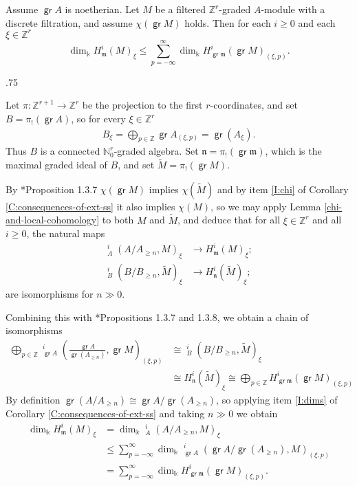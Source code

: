 \documentclass[11pt,fleqn]{article}
\makeatletter
\renewenvironment{proof}[1][\textit{Proof}]{\par
  \pushQED{\qed}%
  \normalfont \topsep.75\paraskip\relax
  \trivlist
  \item[\hskip\labelsep
        \itshape
    #1\@addpunct{.}]\ignorespaces
}{%
  \popQED\endtrivlist\@endpefalse
}
\newcommand\NN{\mathbb N}
\newcommand\ZZ{\mathbb Z}
\renewcommand\to{\longrightarrow}
\renewcommand\k{\Bbbk}
\newcommand\m{\mathfrak m}
\newcommand\n{\mathfrak n}
\DeclareMathOperator\GrExt{\underline{\mathsf{Ext}}}
\DeclareMathOperator\gr{\mathsf{gr}}
\makeatother
\begin{document}
\begin{Corollary*}
Assume $\gr A$ is noetherian. Let $M$ be a filtered $\ZZ^r$-graded $A$-module with a
discrete filtration, and assume $\chi(\gr M)$ holds. Then for each $i \geq 0$ and each 
$\xi \in \ZZ^r$ 
  \[
    \dim_\k H^i_\m(M)_\xi \leq \sum_{p=- \infty}^\infty \dim_\k H^i_{\gr \m}(\gr
    M)_{(\xi, p)}.
  \]
\end{Corollary*}
\begin{proof}
Let $\pi: \ZZ^{r+1} \to \ZZ^r$ be the projection to the first $r$-coordinates, and set $B
= \pi_!(\gr A)$, so for every $\xi \in \ZZ^r$
\begin{align*}
B_\xi = \bigoplus_{p \in \ZZ} \gr A_{(\xi, p)} = \gr (A_\xi).
\end{align*}
Thus $B$ is a connected $\NN_0^r$-graded algebra. Set $\n = \pi_!(\gr \m)$, which is
the maximal graded ideal of $B$, and set $\tilde M = \pi_!(\gr M)$.

By \cite{RZ2}*{Proposition 1.3.7} $\chi(\gr M)$ implies
$\chi(\tilde M)$ and by item \ref{I:chi} of Corollary \ref{C:consequences-of-ext-ss} it 
also implies $\chi(M)$, so we may apply Lemma \ref{chi-and-local-cohomology} to both $M$ 
and $\tilde M$, and deduce that for all $\xi \in \ZZ^r$ and all $i \geq 0$, the natural 
maps 
\begin{align*}
  \GrExt^i_A(A/A_{\geq n}, M)_\xi &\to H^i_\m(M)_\xi;\\
  \GrExt^i_B(B/B_{\geq n}, \tilde M)_\xi &\to H^i_\n( \tilde M)_\xi;
\end{align*}
are isomorphisms for $n \gg 0$.

Combining this with \cite{RZ2}*{Propositions 1.3.7 and 1.3.8}, we obtain a chain of
isomorphisms
\begin{align*}
\bigoplus_{p \in \ZZ} \GrExt^i_{\gr A}\left(\frac{\gr A}{\gr (A_{\geq n})}, \gr M 
  \right)_{(\xi, p)} 
  &\cong \GrExt^i_B \left(B/B_{\geq n}, \tilde M \right)_\xi  \\
  &\cong H^i_\n(\tilde M)_\xi 
  \cong \bigoplus_{p \in \ZZ} H^i_{\gr \m}(\gr M)_{(\xi, p)} 
\end{align*}
By definition $\gr(A/A_{\geq n}) \cong \gr A / \gr (A_{\geq n})$, so applying item 
\ref{I:dims} of Corollary \ref{C:consequences-of-ext-ss} and taking $n \gg 0$ we obtain
\begin{align*}
\dim_\k H^i_\m(M)_\xi 
  &= \dim_\k \GrExt^i_A(A/A_{\geq n}, M)_\xi \\
  &\leq \sum_{p = -\infty}^\infty \dim_\k
  \GrExt^i_{\gr A}(\gr A / \gr (A_{\geq n}), M)_{(\xi, p)} \\
  &= \sum_{p = -\infty}^\infty \dim_\k H^i_{\gr \m}(\gr M)_{(\xi, p)}.
\end{align*}
\end{proof}
\end{document}
